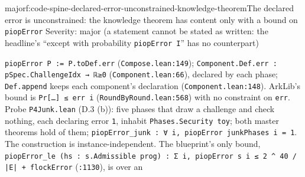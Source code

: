 \begin{finding}{major}{f:code-spine-declared-error-unconstrained-knowledge-theorem}{The declared error is unconstrained: the knowledge theorem has content only with a bound on \texttt{piopError}}
Severity: major (a statement cannot be stated as written: the headline's \enquote{except with probability \texttt{piopError I}} has no counterpart)

\texttt{piopError P := P.\allowbreak{}toDef.\allowbreak{}err} (\texttt{Compose.\allowbreak{}lean:149}); \texttt{C\allowbreak{}o\allowbreak{}m\allowbreak{}p\allowbreak{}o\allowbreak{}n\allowbreak{}e\allowbreak{}n\allowbreak{}t\allowbreak{}.\allowbreak{}D\allowbreak{}e\allowbreak{}f\allowbreak{}.\allowbreak{}e\allowbreak{}r\allowbreak{}r\allowbreak{} :\allowbreak{} p\allowbreak{}S\allowbreak{}p\allowbreak{}e\allowbreak{}c\allowbreak{}.\allowbreak{}C\allowbreak{}h\allowbreak{}a\allowbreak{}l\allowbreak{}l\allowbreak{}e\allowbreak{}n\allowbreak{}g\allowbreak{}e\allowbreak{}I\allowbreak{}d\allowbreak{}x\allowbreak{} →\allowbreak{} ℝ\allowbreak{}≥\allowbreak{}0} (\texttt{Component.\allowbreak{}lean:66}), declared by each phase; \texttt{Def.\allowbreak{}append} keeps each component's declaration (\texttt{Component.\allowbreak{}lean:148}). ArkLib's bound is \texttt{Pr[…] ≤ err i} (\texttt{RoundByRound.\allowbreak{}lean:568}) with no constraint on \texttt{err}. Probe \texttt{P4Junk.\allowbreak{}lean} (D.3 (b)): five phases that draw a challenge and check nothing, each declaring error \texttt{1}, inhabit \texttt{Phases.\allowbreak{}Security toy}; both master theorems hold of them; \texttt{p\allowbreak{}i\allowbreak{}o\allowbreak{}p\allowbreak{}E\allowbreak{}r\allowbreak{}r\allowbreak{}o\allowbreak{}r\allowbreak{}\_\allowbreak{}j\allowbreak{}u\allowbreak{}n\allowbreak{}k\allowbreak{} :\allowbreak{} ∀\allowbreak{} i\allowbreak{},\allowbreak{} p\allowbreak{}i\allowbreak{}o\allowbreak{}p\allowbreak{}E\allowbreak{}r\allowbreak{}r\allowbreak{}o\allowbreak{}r\allowbreak{} j\allowbreak{}u\allowbreak{}n\allowbreak{}k\allowbreak{}P\allowbreak{}h\allowbreak{}a\allowbreak{}s\allowbreak{}e\allowbreak{}s\allowbreak{} i\allowbreak{} =\allowbreak{} 1}. The construction is instance-independent. The blueprint's only bound, \texttt{p\allowbreak{}i\allowbreak{}o\allowbreak{}p\allowbreak{}E\allowbreak{}r\allowbreak{}r\allowbreak{}o\allowbreak{}r\allowbreak{}\_\allowbreak{}l\allowbreak{}e\allowbreak{} (\allowbreak{}h\allowbreak{}s\allowbreak{} :\allowbreak{} s\allowbreak{}.\allowbreak{}A\allowbreak{}d\allowbreak{}m\allowbreak{}i\allowbreak{}s\allowbreak{}s\allowbreak{}i\allowbreak{}b\allowbreak{}l\allowbreak{}e\allowbreak{} p\allowbreak{}r\allowbreak{}o\allowbreak{}g\allowbreak{})\allowbreak{} :\allowbreak{} Σ\allowbreak{} i\allowbreak{},\allowbreak{} p\allowbreak{}i\allowbreak{}o\allowbreak{}p\allowbreak{}E\allowbreak{}r\allowbreak{}r\allowbreak{}o\allowbreak{}r\allowbreak{} s\allowbreak{} i\allowbreak{} ≤\allowbreak{} 2\allowbreak{} \textasciicircum{}\allowbreak{} 4\allowbreak{}0\allowbreak{} /\allowbreak{} |\allowbreak{}E\allowbreak{}|\allowbreak{} +\allowbreak{} f\allowbreak{}l\allowbreak{}o\allowbreak{}c\allowbreak{}k\allowbreak{}E\allowbreak{}r\allowbreak{}r\allowbreak{}o\allowbreak{}r} (\texttt{:1130}), is over an 
\end{finding}
